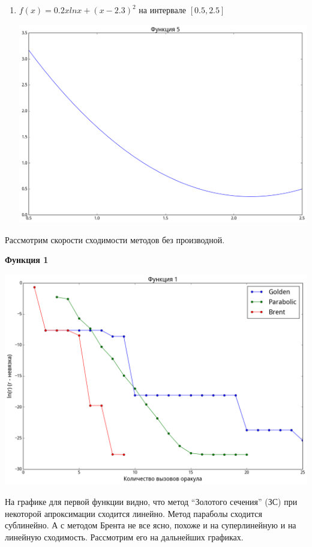 \documentclass[12pt, a4paper]{article}
\begin{document}
\begin{enumerate}
            \item $f(x) = 0.2x ln x + (x - 2.3)^2$ на интервале $[0.5, 2.5]$
                \begin{center}\includegraphics[width=\picwidth, height=\picheight]{fun5.png}\end{center}

        \end{enumerate}

        Рассмотрим скорости сходимости методов без производной.
        \def \picwidth {15.2cm}

        \textbf{Функция 1}

        \includegraphics[width=\picwidth]{pics/fun1_nonder.png}

        На графике для первой функции видно, что метод ``Золотого сечения'' (ЗС) при некоторой апроксимации сходится линейно. Метод параболы сходится сублинейно. А с методом Брента не все ясно, похоже и на суперлинейную и на линейную сходимость. Рассмотрим его на дальнейших графиках.
\end{document}
